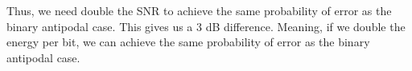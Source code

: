 \documentclass{article}
\begin{document}
\begin{enumerate}[label=3.\arabic*]
    Thus, we need double the SNR to achieve the same probability of error as the binary antipodal case. This gives us a 3 dB difference. Meaning, if we double the energy per bit, we can achieve the same probability of error as the binary antipodal case.

\end{enumerate}


\end{document}
